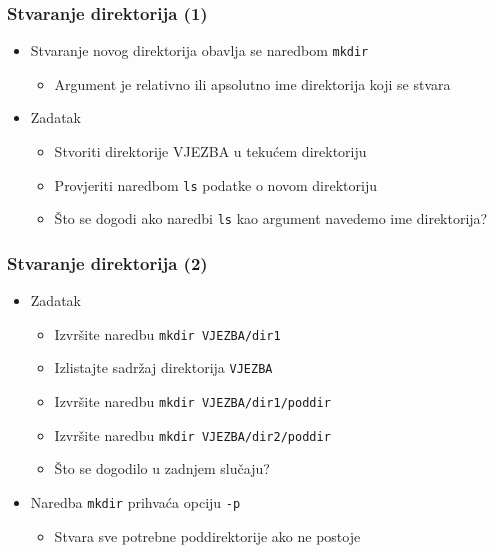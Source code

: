\documentclass{beamer}
\begin{document}
\begin{frame}[t]
\frametitle{Stvaranje direktorija (1)}
\begin{itemize}
  \item Stvaranje novog direktorija obavlja se naredbom \texttt{mkdir}
  \begin{itemize}
    \item Argument je relativno ili apsolutno ime direktorija koji se
          stvara
  \end{itemize}
  \item Zadatak
  \begin{itemize}
    \item Stvoriti direktorije VJEZBA u tekućem direktoriju
    \item Provjeriti naredbom \texttt{ls} podatke o novom direktoriju
    \item Što se dogodi ako naredbi \texttt{ls} kao argument navedemo
          ime direktorija?
  \end{itemize}
\end{itemize}
\end{frame} 

\begin{frame}[t]
\frametitle{Stvaranje direktorija (2)}
\begin{itemize}
  \item Zadatak
  \begin{itemize}
    \item Izvršite naredbu \texttt{mkdir VJEZBA/dir1}
    \item Izlistajte sadržaj direktorija \texttt{VJEZBA}
    \item Izvršite naredbu \texttt{mkdir VJEZBA/dir1/poddir}
    \item Izvršite naredbu \texttt{mkdir VJEZBA/dir2/poddir}
    \item Što se dogodilo u zadnjem slučaju? 
  \end{itemize}
  \item Naredba \texttt{mkdir} prihvaća opciju \texttt{-p}
  \begin{itemize}
    \item Stvara sve potrebne poddirektorije ako ne postoje
  \end{itemize}
\end{itemize}
\end{frame}
\end{document}
